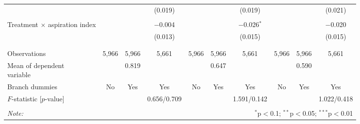 \documentclass{report}
\begin{document}
\begin{table}[!htbp]
\begin{tabular}{@{\extracolsep{5pt}}lccccccccc}
  &  &  & (0.019) &  &  & (0.019) &  &  & (0.021) \\ 
  & & & & & & & & & \\ 
 \makecell[l]{Treatment $\times$ aspiration\\\hspace{1em}index} &  &  & $-$0.004 &  &  & $-$0.026$^{*}$ &  &  & $-$0.020 \\ 
  &  &  & (0.013) &  &  & (0.015) &  &  & (0.015) \\ 
  & & & & & & & & & \\ 
\hline \\[-1.8ex] 
Observations & 5,966 & 5,966 & 5,661 & 5,966 & 5,966 & 5,661 & 5,966 & 5,966 & 5,661 \\ 
\makecell[l]{Mean of dependent\\\hspace{1em}variable} &  & 0.819 &  &  & 0.647 &  &  & 0.590 &  \\ 
Branch dummies & No & Yes & Yes & No & Yes & Yes & No & Yes & Yes \\ 
$F$-statistic [$p$-value] &   &   & 0.656/0.709 &   &   & 1.591/0.142 &   &   & 1.022/0.418 \\ 
\hline \\[-1.8ex] 
\textit{Note:}  & \multicolumn{9}{r}{$^{*}$p$<$0.1; $^{**}$p$<$0.05; $^{***}$p$<$0.01} \\ 
\end{tabular} 
\end{table} 
\end{document}

